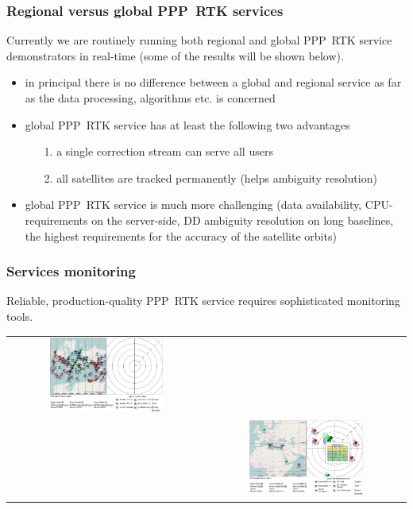 \documentclass[10pt]{beamer}
\begin{document}

\begin{frame}
  \frametitle{Regional versus global PPP~RTK services} 
  Currently we are routinely running both regional and global PPP~RTK service
  demonstrators in real-time (some of the results will be shown below).
  \begin{itemize}
  \item in principal there is no difference between a global and regional
    service as far as the data processing, algorithms etc. is concerned
  \item global PPP~RTK service has at least the following two advantages
     \begin{itemize}
     \item[1.] a single correction stream can serve all users
     \item[2.] all satellites are tracked permanently (helps ambiguity 
               resolution)
     \end{itemize}
  \item global PPP~RTK service is much more challenging (data availability,
    CPU-requirements on the server-side, DD ambiguity resolution on long
    baselines, the highest requirements for the accuracy of the satellite
    orbits)
  \end{itemize}

\end{frame}


\begin{frame}
  \frametitle{Services monitoring} 
  Reliable, production-quality PPP~RTK service requires sophisticated
  monitoring tools.
  \begin{tabular}{cc}
  \includegraphics[width=0.6\textwidth]{monitor1.png} & \\[-1.5cm]
  & \hspace*{-3cm} \includegraphics[width=0.6\textwidth]{monitor2.png}
  \end{tabular}

\end{frame}
\end{document}

